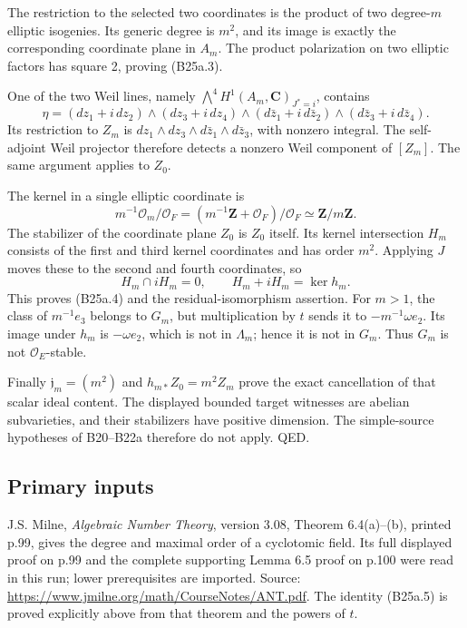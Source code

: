\documentclass[11pt,a4paper]{article}
\theoremstyle{definition}
\begin{document}
The restriction to the selected two coordinates is the product of two degree-\(m\) elliptic isogenies. Its generic degree is \(m^2\), and its image is exactly the corresponding coordinate plane in \(A_m\). The product polarization on two elliptic factors has square 2, proving (B25a.3).

One of the two Weil lines, namely \(\bigwedge^4 H^1(A_m,\mathbf C)_{J^*=i}\), contains \[
 \eta=(dz_1+i\,dz_2)\wedge(dz_3+i\,dz_4)
       \wedge(d\bar z_1+i\,d\bar z_2)
       \wedge(d\bar z_3+i\,d\bar z_4).
\] Its restriction to \(Z_m\) is \(dz_1\wedge dz_3\wedge d\bar z_1\wedge d\bar z_3\), with nonzero integral. The self-adjoint Weil projector therefore detects a nonzero Weil component of \([Z_m]\). The same argument applies to \(Z_0\).

The kernel in a single elliptic coordinate is \[
 m^{-1}\mathcal O_m/\mathcal O_F
       =(m^{-1}\mathbf Z+\mathcal O_F)/\mathcal O_F\simeq\mathbf Z/m\mathbf Z.
\] The stabilizer of the coordinate plane \(Z_0\) is \(Z_0\) itself. Its kernel intersection \(H_m\) consists of the first and third kernel coordinates and has order \(m^2\). Applying \(J\) moves these to the second and fourth coordinates, so \[
 H_m\cap iH_m=0,\qquad H_m+iH_m=\ker h_m.
\] This proves (B25a.4) and the residual-isomorphism assertion. For \(m>1\), the class of \(m^{-1}e_3\) belongs to \(G_m\), but multiplication by \(t\) sends it to \(-m^{-1}\omega e_2\). Its image under \(h_m\) is \(-\omega e_2\), which is not in \(\Lambda_m\); hence it is not in \(G_m\). Thus \(G_m\) is not \(\mathcal O_E\)-stable.

Finally \(\mathfrak j_m=(m^2)\) and \(h_{m*}Z_0=m^2Z_m\) prove the exact cancellation of that scalar ideal content. The displayed bounded target witnesses are abelian subvarieties, and their stabilizers have positive dimension. The simple-source hypotheses of B20--B22a therefore do not apply. QED.

\subsection{Primary inputs}\label{primary-inputs}

J.S. Milne, \emph{Algebraic Number Theory}, version 3.08, Theorem 6.4(a)--(b), printed p.99, gives the degree and maximal order of a cyclotomic field. Its full displayed proof on p.99 and the complete supporting Lemma 6.5 proof on p.100 were read in this run; lower prerequisites are imported. Source: \url{https://www.jmilne.org/math/CourseNotes/ANT.pdf}. The identity (B25a.5) is proved explicitly above from that theorem and the powers of \(t\).
\end{document}
